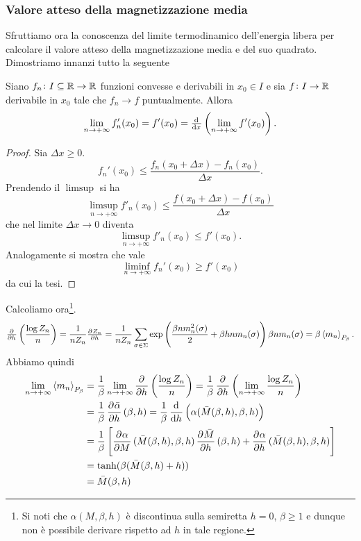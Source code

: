 \subsubsection{Valore atteso della magnetizzazione media}
Sfruttiamo ora la conoscenza del limite termodinamico dell'energia libera per calcolare il valore atteso della magnetizzazione media e del suo quadrato. Dimostriamo innanzi tutto la seguente
\begin{proposition}
    Siano $ f_n\colon I\subseteq\mathbb{R} \to \mathbb{R} $ funzioni convesse e derivabili in $ x_0 \in I $ e sia $ f\colon I\to\mathbb{R} $ derivabile in $ x_0 $ tale che $ f_n \to f $ puntualmente. Allora
    \[ \lim_{n \to +\infty} f_n'(x_0) = f'(x_0) = \od{}{x} \left( \lim_{n \to +\infty} f'(x_0) \right). \]
\end{proposition}
\begin{proof}\label{prop:convessascambio}
    Sia $ \Delta x \geq 0 $.
    \[ f_n'(x_0) \leq \frac{f_n(x_0+\Delta x)-f_n(x_0)}{\Delta x}. \]
    Prendendo il $ \limsup $ si ha
    \[ \limsup_{n\to +\infty} f'_n(x_0) \leq \frac{f(x_0+\Delta x)-f(x_0)}{\Delta x} \]
    che nel limite $ \Delta x \to 0 $ diventa
    \[ \limsup_{n\to +\infty} f'_n(x_0) \leq f'(x_0). \]
    Analogamente si mostra che vale
    \[ \liminf_{n\to +\infty} f_n'(x_0) \geq f'(x_0) \]
    da cui la tesi.
\end{proof}
Calcoliamo ora\footnote{Si noti che $ \alpha(M,\beta,h) $ è discontinua sulla semiretta $ h=0 $, $ \beta \geq 1 $ e dunque non è possibile derivare rispetto ad $ h $ in tale regione.}.
\[ \pd{}{h}\left(\frac{\log Z_n}{n}\right) = \frac{1}{n Z_n} \pd{Z_n}{h} = \frac{1}{nZ_n}\sum_{\sigma \in \Sigma} \exp\left( \frac{\beta n m_n^2(\sigma)}{2} + \beta h n m_n(\sigma) \right) \beta n m_n(\sigma) = \beta \mean{m_n}_{P_\beta}. \]
Abbiamo quindi
\begin{align}
	\label{eq:limmagnmedia}
    \lim_{n \to +\infty}\mean{m_n}_{P_\beta} & = \frac{1}{\beta} \lim_{n \to +\infty} \dpd{}{h}\left(\frac{\log Z_n}{n}\right) = \frac{1}{\beta} \dpd{}{h} \left( \lim_{n \to +\infty} \frac{\log Z_n}{n} \right) \nonumber \\
	                                         & = \frac{1}{\beta} \dpd{\bar{\alpha}}{h}(\beta, h) = \frac{1}{\beta} \dod{}{h} \left( \alpha(\bar{M}(\beta,h), \beta, h)\right) \nonumber \\
                                             & = \frac{1}{\beta} \left[ \dpd{\alpha}{M}(\bar{M}(\beta,h),\beta,h) \dpd{\bar{M}}{h}(\beta,h) + \dpd{\alpha}{h}(\bar{M}(\beta,h),\beta,h) \right] \nonumber \\
                                             & = \tanh(\beta(\bar{M}(\beta,h)+h))  \nonumber \\
                                             & = \bar{M}(\beta, h)
\end{align}
